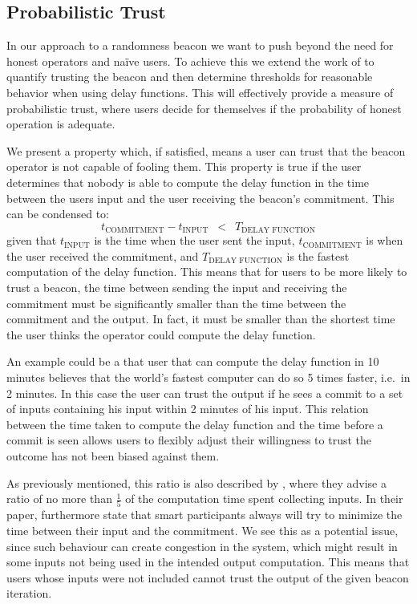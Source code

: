 \subsection{Probabilistic Trust}%
\label{sub:probabilistic_trust}
In our approach to a randomness beacon we want to push beyond the need for honest operators and naïve users.
To achieve this we extend the work of \citet{randomzoo} to quantify trusting the beacon and then determine thresholds for reasonable behavior when using delay functions.
This will effectively provide a measure of probabilistic trust, where users decide for themselves if the probability of honest operation is adequate.


We present a property which, if satisfied, means a user can trust that the beacon operator is not capable of fooling them.
This property is true if the user determines that nobody is able to compute the delay function in the time between the users input and the user receiving the beacon's commitment.
This can be condensed to:
\begin{equation*}
    t_\text{COMMITMENT} - t_\text{INPUT}\enspace <\enspace T_\text{DELAY FUNCTION}
\end{equation*}
given that $t_\text{INPUT}$ is the time when the user sent the input, $t_\text{COMMITMENT}$ is when the user received the commitment, and $T_\text{DELAY FUNCTION}$ is the fastest computation of the delay function.
This means that for users to be more likely to trust a beacon, the time between sending the input and receiving the commitment must be significantly smaller than the time between the commitment and the output.
In fact, it must be smaller than the shortest time the user thinks the operator could compute the delay function.

An example could be a that user that can compute the delay function in 10 minutes believes that the world's fastest computer can do so 5 times faster, i.e.\ in 2 minutes. In this case the user can trust the output if he sees a commit to a set of inputs containing his input within 2 minutes of his input.
This relation between the time taken to compute the delay function and the time before a commit is seen allows users to flexibly adjust their willingness to trust the outcome has not been biased against them.

As previously mentioned, this ratio is also described by \citet{randomzoo}, where they advise a ratio of no more than $\frac{1}{5}$ of the computation time spent collecting inputs.
In their paper, \citeauthor{randomzoo} furthermore state that smart participants always will try to minimize the time between their input and the commitment.
We see this as a potential issue, since such behaviour can create congestion in the system, which might result in some inputs not being used in the intended output computation.
This means that users whose inputs were not included cannot trust the output of the given beacon iteration.

